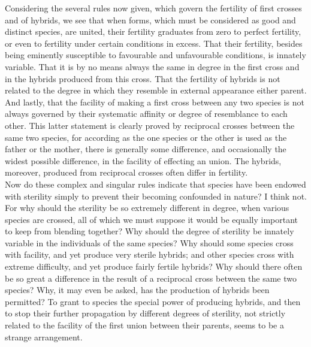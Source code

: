 \indent Considering the several rules now given, which govern the fertility of first crosses and of hybrids, we see that when forms, which must be considered as good and distinct species, are united, their fertility graduates from zero to perfect fertility, or even to fertility under certain conditions in excess. That their fertility, besides being eminently susceptible to favourable and unfavourable conditions, is innately variable. That it is by no means always the same in degree in the first cross and in the hybrids produced from this cross. That the fertility of hybrids is not related to the degree in which they resemble in external appearance either parent. And lastly, that the facility of making a first cross between any two species is not always governed by their systematic affinity or degree of resemblance to each other. This latter statement is clearly proved by reciprocal crosses between the same two species, for according as the one species or the other is used as the father or the mother, there is generally some difference, and occasionally the widest possible difference, in the facility of effecting an union. The hybrids, moreover, produced from reciprocal crosses often differ in fertility.\\
\indent Now do these complex and singular rules indicate that species have been endowed with sterility simply to prevent their becoming confounded in nature?  I think not. For why should the sterility be so extremely different in degree, when various species are crossed, all of which we must suppose it would be equally important to keep from blending together? Why should the degree of sterility be innately variable in the individuals of the same species? Why should some species cross with facility, and yet produce very sterile hybrids; and other species cross with extreme difficulty, and yet produce fairly fertile hybrids? Why should there often be so great a difference in the result of a reciprocal cross between the same two species? Why, it may even be asked, has the production of hybrids been permitted?  To grant to species the special power of producing hybrids, and then to stop their further propagation by different degrees of sterility, not strictly related to the facility of the first union between their parents, seems to be a strange arrangement.\\
